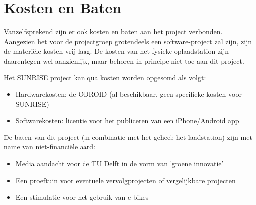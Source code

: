\section{Kosten en Baten}
Vanzelfsprekend zijn er ook kosten en baten aan het project verbonden. Aangezien het voor de projectgroep grotendeels een software-project zal zijn, zijn de materi\"ele kosten vrij laag. De kosten van het fysieke oplaadstation zijn daarentegen wel aanzienlijk, maar behoren in principe niet toe aan dit project.

Het SUNRISE project kan qua kosten worden opgesomd als volgt:
\begin{itemize}
\item Hardwarekosten: de ODROID (al beschikbaar, geen specifieke kosten voor SUNRISE)
\item Softwarekosten: licentie voor het publiceren van een iPhone/Android app
\end{itemize}

\noindent
De baten van dit project (in combinatie met het geheel; het laadstation) zijn met name van niet-financiële aard:
\begin{itemize}
\item Media aandacht voor de TU Delft in de vorm van 'groene innovatie'
\item Een proeftuin voor eventuele vervolgprojecten of vergelijkbare projecten
\item Een stimulatie voor het gebruik van e-bikes
\end{itemize}